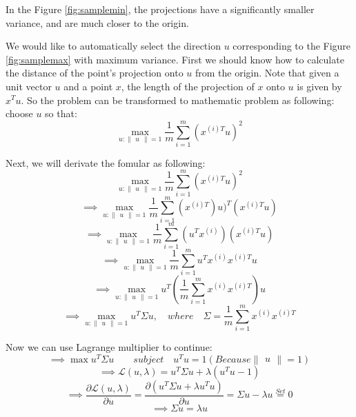 \documentclass[a4paper]{article}
\begin{document}
In the Figure \ref{fig:samplemin}, the projections have a significantly smaller variance, and are much closer to the origin.

We would like to automatically select the direction $u$ corresponding to the Figure \ref{fig:samplemax} with maximum variance.  First we should know how to calculate the distance of the point's projection onto $u$ from the origin. Note that given a unit vector $u$ and a point $x$, the length of the projection of $x$ onto $u$ is given by $x^{T}u$. So the problem can be transformed to mathematic problem as following: choose $u$ so that:
$$
	\max_{u:\begin{Vmatrix}u\end{Vmatrix}=1} \frac{1}{m} \sum_{i=1}^{m}(x^{(i)T}u)^{2}
$$

Next, we will derivate the fomular as following:
$$
	\max_{u:\begin{Vmatrix}u\end{Vmatrix}=1} \frac{1}{m} \sum_{i=1}^{m}(x^{(i)T}u)^{2}
$$
$$
	\implies \max_{u:\begin{Vmatrix}u\end{Vmatrix}=1} \frac{1}{m} \sum_{i=1}^{m}(x^{(i)T})u)^{T}(x^{(i)T}u)
$$
$$
	\implies \max_{u:\begin{Vmatrix}u\end{Vmatrix}=1} \frac{1}{m} \sum_{i=1}^{m}(u^Tx^{(i)})(x^{(i)T}u)
$$
$$
	\implies \max_{u:\begin{Vmatrix}u\end{Vmatrix}=1} \frac{1}{m} \sum_{i=1}^{m}u^Tx^{(i)}x^{(i)T}u
$$
$$
	\implies \max_{u:\begin{Vmatrix}u\end{Vmatrix}=1} u^T (\frac{1}{m}\sum_{i=1}^{m}x^{(i)}x^{(i)T})u
$$
$$
	\implies \max_{u:\begin{Vmatrix}u\end{Vmatrix}=1} u^T \Sigma u, \quad where \quad \Sigma=\frac{1}{m}\sum_{i=1}^{m}x^{(i)}x^{(i)T}
$$

Now we can use Lagrange multiplier to continue: 
$$
	\implies \max u^T \Sigma u
   	\quad \quad subject\quad u^Tu = 1(Because \begin{Vmatrix}u\end{Vmatrix}=1)
$$
$$
	\implies \mathcal{L}(u,\lambda) = u^T \Sigma u + \lambda (u^Tu - 1)
$$
$$
	\implies \frac{\partial \mathcal{L}(u,\lambda)}{\partial u} = \frac{\partial(u^T\Sigma u+\lambda u^Tu)}{\partial u}
    = \Sigma u - \lambda u \overset{Set}{=} 0
$$
$$
	\implies \Sigma u = \lambda u
$$
\end{document}
